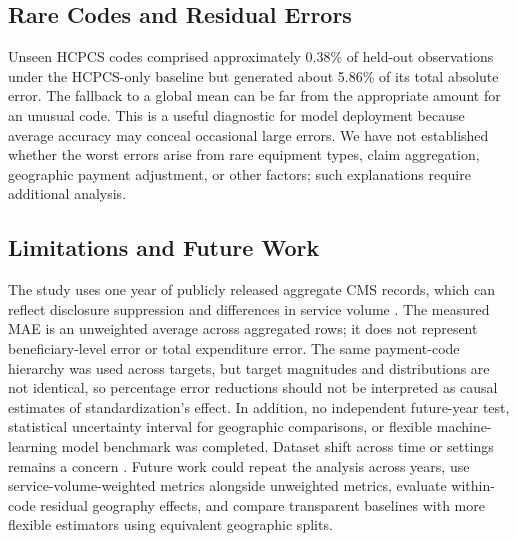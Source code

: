 \subsection{Rare Codes and Residual Errors}
Unseen HCPCS codes comprised approximately 0.38\% of held-out observations under the HCPCS-only baseline but generated about 5.86\% of its total absolute error. The fallback to a global mean can be far from the appropriate amount for an unusual code. This is a useful diagnostic for model deployment because average accuracy may conceal occasional large errors. We have not established whether the worst errors arise from rare equipment types, claim aggregation, geographic payment adjustment, or other factors; such explanations require additional analysis.

\subsection{Limitations and Future Work}
The study uses one year of publicly released aggregate CMS records, which can reflect disclosure suppression and differences in service volume \citep{cmsdme2023}. The measured MAE is an unweighted average across aggregated rows; it does not represent beneficiary-level error or total expenditure error. The same payment-code hierarchy was used across targets, but target magnitudes and distributions are not identical, so percentage error reductions should not be interpreted as causal estimates of standardization's effect. In addition, no independent future-year test, statistical uncertainty interval for geographic comparisons, or flexible machine-learning model benchmark was completed. Dataset shift across time or settings remains a concern \citep{subbaswamy2020}. Future work could repeat the analysis across years, use service-volume-weighted metrics alongside unweighted metrics, evaluate within-code residual geography effects, and compare transparent baselines with more flexible estimators using equivalent geographic splits.